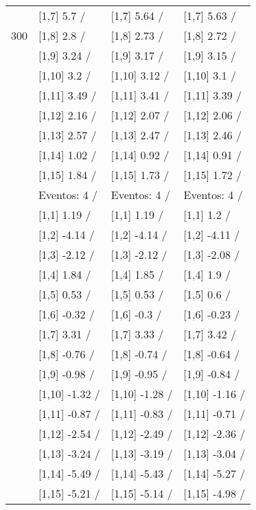 \begin{table}
\begin{tabular}[t]{llll}
 & {}[1,7] 5.7  / & {}[1,7] 5.64  / & {}[1,7] 5.63  /\\
300 & {}[1,8] 2.8  / & {}[1,8] 2.73  / & {}[1,8] 2.72  /\\
\addlinespace
 & {}[1,9] 3.24  / & {}[1,9] 3.17  / & {}[1,9] 3.15  /\\
 & {}[1,10] 3.2  / & {}[1,10] 3.12  / & {}[1,10] 3.1  /\\
 & {}[1,11] 3.49  / & {}[1,11] 3.41  / & {}[1,11] 3.39  /\\
 & {}[1,12] 2.16  / & {}[1,12] 2.07  / & {}[1,12] 2.06  /\\
 & {}[1,13] 2.57  / & {}[1,13] 2.47  / & {}[1,13] 2.46  /\\
\addlinespace
 & {}[1,14] 1.02  / & {}[1,14] 0.92  / & {}[1,14] 0.91  /\\
 & {}[1,15] 1.84  / & {}[1,15] 1.73  / & {}[1,15] 1.72  /\\
 & Eventos:  4 / & Eventos:  4 / & Eventos:  4 /\\
 & {}[1,1] 1.19  / & {}[1,1] 1.19  / & {}[1,1] 1.2  /\\
 & {}[1,2] -4.14  / & {}[1,2] -4.14  / & {}[1,2] -4.11  /\\
\addlinespace
 & {}[1,3] -2.12  / & {}[1,3] -2.12  / & {}[1,3] -2.08  /\\
 & {}[1,4] 1.84  / & {}[1,4] 1.85  / & {}[1,4] 1.9  /\\
 & {}[1,5] 0.53  / & {}[1,5] 0.53  / & {}[1,5] 0.6  /\\
 & {}[1,6] -0.32  / & {}[1,6] -0.3  / & {}[1,6] -0.23  /\\
 & {}[1,7] 3.31  / & {}[1,7] 3.33  / & {}[1,7] 3.42  /\\
\addlinespace
500 & {}[1,8] -0.76  / & {}[1,8] -0.74  / & {}[1,8] -0.64  /\\
 & {}[1,9] -0.98  / & {}[1,9] -0.95  / & {}[1,9] -0.84  /\\
 & {}[1,10] -1.32  / & {}[1,10] -1.28  / & {}[1,10] -1.16  /\\
 & {}[1,11] -0.87  / & {}[1,11] -0.83  / & {}[1,11] -0.71  /\\
 & {}[1,12] -2.54  / & {}[1,12] -2.49  / & {}[1,12] -2.36  /\\
\addlinespace
 & {}[1,13] -3.24  / & {}[1,13] -3.19  / & {}[1,13] -3.04  /\\
 & {}[1,14] -5.49  / & {}[1,14] -5.43  / & {}[1,14] -5.27  /\\
 & {}[1,15] -5.21  / & {}[1,15] -5.14  / & {}[1,15] -4.98  /\\
\bottomrule
\end{tabular}
\end{table}
